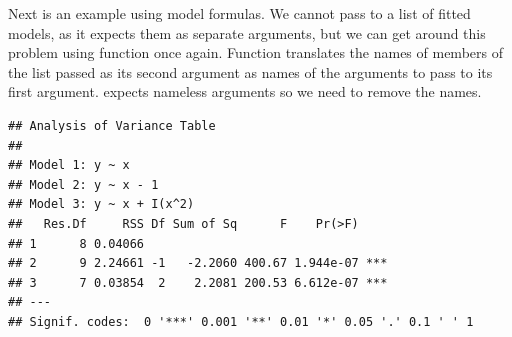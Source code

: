 \documentclass[krantz2]{krantz}\usepackage{knitr}%
\begin{document}
Next is an example using model formulas. We cannot pass to  a list of fitted models, as it expects them as separate arguments, but we can get around this problem using function  once again. Function  translates the names of members of the list passed as its second argument as names of the arguments to pass to its first argument.  expects nameless arguments so we need to remove the names.
\begin{knitrout}\footnotesize
{}\color{fgcolor}\begin{kframe}
\begin{alltt}
 \hlkwb{<-} \hlstd{(} \hlstd{=} \hlopt{:}\hlstd{,}  \hlstd{=} \hlopt{:} \hlopt{+} \hlstd{(}\hlstd{,} \hlstd{,} \hlstd{))}
 \hlkwb{<-} \hlstd{()}
 \hlkwb{<-} \hlstd{(}  \hlopt{~}    \hlopt{~}  \hlopt{-} \hlstd{,}   \hlopt{~}  \hlopt{+} \hlopt{^}\hlstd{))}
   
    \hlkwb{<-}   
   \hlstd{\}}
 
\end{alltt}
\begin{verbatim}
## Analysis of Variance Table
## 
## Model 1: y ~ x
## Model 2: y ~ x - 1
## Model 3: y ~ x + I(x^2)
##   Res.Df     RSS Df Sum of Sq      F    Pr(>F)    
## 1      8 0.04066                                  
## 2      9 2.24661 -1   -2.2060 400.67 1.944e-07 ***
## 3      7 0.03854  2    2.2081 200.53 6.612e-07 ***
## ---
## Signif. codes:  0 '***' 0.001 '**' 0.01 '*' 0.05 '.' 0.1 ' ' 1
\end{verbatim}
\end{kframe}
\end{knitrout}
\end{document}
